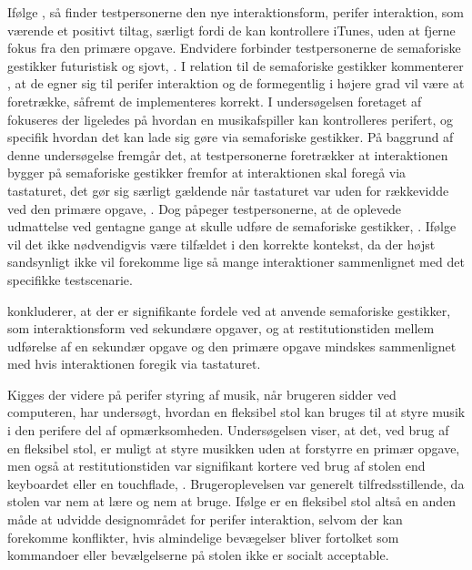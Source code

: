 Ifølge \textcite[ss. 173-174]{PDF:ComparingInputModalities}, så finder testpersonerne den nye interaktionsform, perifer interaktion, som værende et positivt tiltag, særligt fordi de kan kontrollere iTunes, uden at fjerne fokus fra den primære opgave. Endvidere forbinder testpersonerne de semaforiske gestikker futuristisk og sjovt, \parencite[s. 174]{PDF:ComparingInputModalities}. I relation til de semaforiske gestikker kommenterer \textcite[s. 177]{PDF:ComparingInputModalities}, at de egner sig til perifer interaktion og de formegentlig i højere grad vil være at foretrække, såfremt de implementeres korrekt.\blankline
%                    
I undersøgelsen foretaget af \textcite{PDF:AStudyOnTheUseOfSemaphoricGestures} fokuseres der ligeledes på hvordan en musikafspiller kan kontrolleres perifert, og specifik hvordan det kan lade sig gøre via semaforiske gestikker. På baggrund af denne undersøgelse fremgår det, at testpersonerne foretrækker at interaktionen bygger på semaforiske gestikker fremfor at interaktionen skal foregå via tastaturet, det gør sig særligt gældende når tastaturet var uden for rækkevidde ved den primære opgave, \parencite[s. 1963]{PDF:AStudyOnTheUseOfSemaphoricGestures}. Dog påpeger testpersonerne, at de oplevede udmattelse ved gentagne gange at skulle udføre de semaforiske gestikker, \parencite[s. 1963]{PDF:AStudyOnTheUseOfSemaphoricGestures}. Ifølge \textcite[s. 1963]{PDF:AStudyOnTheUseOfSemaphoricGestures} vil det ikke nødvendigvis være tilfældet i den korrekte kontekst, da der højst sandsynligt ikke vil forekomme lige så mange interaktioner sammenlignet med det specifikke testscenarie. 

\textcite[s. 1964]{PDF:AStudyOnTheUseOfSemaphoricGestures} konkluderer, at der er signifikante fordele ved at anvende semaforiske gestikker, som interaktionsform ved sekundære opgaver, og at restitutionstiden mellem udførelse af en sekundær opgave og den primære opgave mindskes sammenlignet med hvis interaktionen foregik via tastaturet.\blankline
%

Kigges der videre på perifer styring af musik, når brugeren sidder ved computeren, har \textcite[ss. 5-9]{PDF:AChairAsUbiquitousInputDevice} undersøgt, hvordan en fleksibel stol kan bruges til at styre musik i den perifere del af opmærksomheden. Undersøgelsen viser, at det, ved brug af en fleksibel stol, er muligt at styre musikken uden at forstyrre en primær opgave, men også at restitutionstiden var signifikant kortere ved brug af stolen end keyboardet eller en touchflade, \parencite[s. 7]{PDF:AChairAsUbiquitousInputDevice}. Brugeroplevelsen var generelt tilfredsstillende, da stolen var nem at lære og nem at bruge. Ifølge \textcite[s. 8]{PDF:AChairAsUbiquitousInputDevice} er en fleksibel stol altså en anden måde at udvidde designområdet for perifer interaktion, selvom der kan forekomme konflikter, hvis almindelige bevægelser bliver fortolket som kommandoer eller bevælgelserne på stolen ikke er socialt acceptable.

